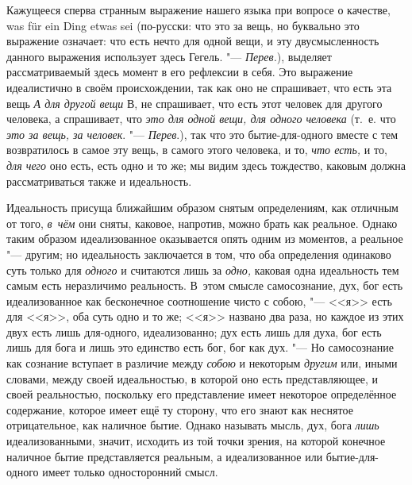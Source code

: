 Кажущееся сперва странным выражение нашего языка при вопросе о качестве, was
für ein Ding etwas sei (по-русски: что это за вещь, но буквально это
выражение означает: что есть нечто для одной вещи, и эту двусмысленность
данного выражения использует здесь Гегель. "--- {\em Перев.}), выделяет
рассматриваемый здесь момент в его рефлексии в себя. Это выражение
идеалистично в своём происхождении, так как оно не спрашивает, что есть эта
вещь {\em А для другой вещи} В, не спрашивает, что есть
этот человек для другого человека, а спрашивает, что
{\em это для одной вещи, для одного человека} (т.~е.
что {\em это за вещь, за человек}. "--- {\em Перев}.),
так что это бытие-для-одного вместе с тем
возвратилось в самое эту вещь, в самого этого человека, и то,
{\em что есть,} и то, {\em для чего} оно есть,
есть одно и то же; мы видим здесь тождество, каковым должна
рассматриваться также и идеальность.

Идеальность присуща ближайшим образом снятым определениям, как отличным от
того, {\em в~чём} они сняты, каковое, напротив, можно
брать как реальное. Однако таким образом идеализованное оказывается опять
одним из моментов, а реальное "--- другим; но идеальность заключается в том,
что оба определения одинаково суть только для
{\em одного} и считаются лишь за
{\em одно,} каковая одна идеальность тем самым есть
неразличимо реальность. В~этом смысле самосознание, дух, бог есть
идеализованное как бесконечное соотношение чисто с собою, "--- <<я>> есть для
<<я>>, оба суть одно и то же; <<я>> названо два раза, но каждое из этих двух
есть лишь для-одного, идеализованно; дух есть лишь для духа, бог есть лишь
для бога и лишь это единство есть бог, бог как дух. "--- Но самосознание как
сознание вступает в различие между {\em собою} и
некоторым {\em другим} или, иными словами, между своей
идеальностью, в которой оно есть представляющее, и своей реальностью,
поскольку его представление имеет некоторое определённое содержание,
которое имеет ещё ту сторону, что его знают как неснятое отрицательное,
как наличное бытие. Однако называть мысль, дух, бога
{\em лишь} идеализованными, значит, исходить из той
точки зрения, на которой конечное наличное бытие представляется реальным, а
идеализованное или бытие-для-одного имеет только односторонний смысл.

